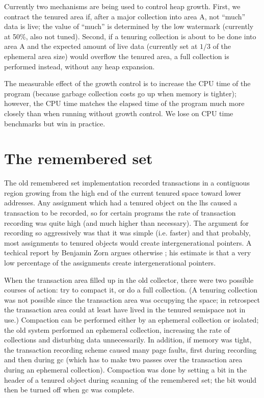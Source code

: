 Currently two mechanisms are being used to control heap growth.  First, we
contract the tenured area if, after a major collection into area A, not
``much'' data is live; the value of ``much'' is determined by the low watermark
(currently at 50\%, also not tuned). Second, if a tenuring collection is
about to be done into area A and the expected amount of live data (currently
set at $1/3$ of the ephemeral area size) would overflow the tenured area,
a full collection is performed instead, without any heap expansion.

The measurable effect of the growth control is to increase the CPU time of
the program (because garbage collection costs go up when memory is tighter);
however, the CPU time matches the elapsed time of the program much more
closely than when running without growth control. We lose on CPU time
benchmarks but win in practice.

\section{The remembered set}
\label{remset}

The old remembered set implementation recorded transactions in a contiguous
region growing from the high end of the current tenured space toward lower
addresses. Any assignment which had a tenured object on the lhs caused a
transaction to be recorded, so for certain programs the rate of transaction
recording was quite high (and much higher than necessary). The argument for
recording so aggressively was that it was simple (i.e. faster) and that
probably, most assignments to tenured objects would create intergenerational
pointers. A techical report by Benjamin Zorn argues otherwise
\cite{zorn-tr}; his estimate is that a very low percentage of the assignments
create intergenerational pointers.

When the transaction area filled up in the old collector, there were two
possible courses of action: try to compact it, or do a full collection.  (A
tenuring collection was not possible since the transaction area was
occupying the space; in retrospect the transaction area could at least have
lived in the tenured semispace not in use.)  Compaction can be performed
either by an ephemeral collection or isolated; the old system performed an
ephemeral collection, increasing the rate of collections and disturbing data
unnecessarily.  In addition, if memory was tight, the transaction recording
scheme caused many page faults, first during recording and then during gc
(which has to make two passes over the transaction area during an ephemeral
collection). Compaction was done by setting a bit in the header of a tenured
object during scanning of the remembered set; the bit would then be turned
off when gc was complete.

